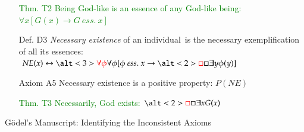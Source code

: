 \documentclass[9pt,mathserif,unknownkeysallowed,xcolor=dvipsnames]{beamer}
\newcommand{\imp}{\rightarrow}
\newcommand{\biimp}{\leftrightarrow}
\newcommand{\allq}{\forall}
\newcommand{\exq}{\exists}
\newcommand{\nec}{\Box} %
\newcommand{\ess}[2]{#1 \ \mathit{ess.} \ #2}
\newcommand{\NE}{\mathit{NE}}
\begin{document}
{{\begin{minipage}{12cm}
\begin{itemize}
\item[\textcolor{Green}{Thm. T2}]  \textcolor{Green}{Being God-like is an essence of any
  God-like being:}  \hfill \textcolor{Green}{${\allq x [G(x) \imp \ess{G}{x}]}$}
\item[Def. D3] \emph{Necessary existence} of an individual~is the necessary exemplification of all its essences: 
  \phantom{b} \hfill ${\NE(x) \biimp \alt<3>{\textcolor{red}{\allq \phi}}{\allq \phi} [\ess{\phi}{x} \imp \alt<2>{\textcolor{red}{\nec}}{\nec}  \exq y \phi(y)]}$
\item[Axiom A5] Necessary existence is a positive property: \hfill ${P(\NE)}$ 
\item[\textcolor{Green}{Thm. T3}] \textcolor{Green}{Necessarily, God exists:} \hfill \textcolor{Green}{${\alt<2>{\textcolor{red}{\nec}}{\nec} \exq x G(x)}$}
\end{itemize}
\end{minipage}
}}




\begin{frame}{G\"odel's Manuscript: Identifying the Inconsistent Axioms}
\end{frame}
\end{document}
